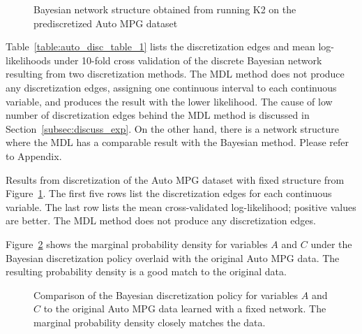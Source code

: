 \begin{figure}[ht]
  \centering
   
   \caption{Bayesian network structure obtained from running K2 on the prediscretized Auto MPG dataset}
  \label{fig:auto_graph_1}
\end{figure}

Table~\ref{table:auto_disc_table_1} lists the discretization edges and mean log-likelihoods under \num{10}-fold cross validation of the discrete Bayesian network resulting from two discretization methods.
The MDL method does not produce any discretization edges, assigning one continuous interval to each continuous variable, and produces the result with the lower likelihood.
The cause of low number of discretization edges behind the MDL method is discussed in Section~\ref{subsec:discuss_exp}. On the other hand, there is a network structure where the MDL has a comparable result with the Bayesian method. Please refer to Appendix.

\begin{table}[h]
  \centering
  \caption{
    Results from discretization of the Auto MPG dataset with fixed structure from Figure~\ref{fig:auto_graph_1}.
    The first five rows list the discretization edges for each continuous variable.
    The last row lists the mean cross-validated log-likelihood; positive values are better.
    The MDL method does not produce any discretization edges.
  }
  
  \label{table:auto_disc_table_1}
\end{table}

Figure~\ref{fig:auto_exp1_distr_1_3} shows the marginal probability density for variables $A$ and $C$ under the Bayesian discretization policy overlaid with the original Auto MPG data.
The resulting probability density is a good match to the original data.

\begin{figure}[ht]
  \centering
  
  \caption{
    Comparison of the Bayesian discretization policy for variables $A$ and $C$ to the original Auto MPG data learned with a fixed network.
    The marginal probability density closely matches the data.
  }
  \label{fig:auto_exp1_distr_1_3}
\end{figure}

\label{subsubsec:auto_exp2}

